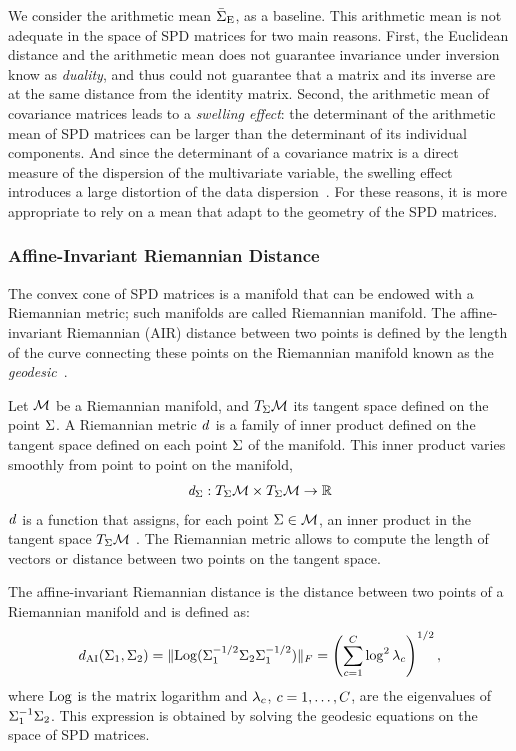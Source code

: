 We consider the arithmetic mean $\PmE$, as a baseline. 
This arithmetic mean is not adequate in the space of SPD matrices for two main reasons. 
First, the Euclidean distance and the arithmetic mean does not guarantee invariance under inversion know as \emph{duality}, and thus could not guarantee that a matrix and its inverse are at the same distance from the identity matrix. 
Second, the arithmetic mean of covariance matrices leads to a \emph{swelling effect}: the determinant of the arithmetic mean of SPD matrices can be larger than the determinant of its individual components.
And since the determinant of a covariance matrix is a direct measure of the dispersion of the multivariate variable, the swelling effect introduces a large distortion of the data dispersion~\cite{arsigny_geometric_2007}.
For these reasons, it is more appropriate to rely on a mean that adapt to the geometry of the SPD matrices. 

\subsubsection{Affine-Invariant Riemannian Distance}

The convex cone of SPD matrices is a manifold that can be endowed with a Riemannian metric; such manifolds are called Riemannian manifold.
The affine-invariant Riemannian (AIR) distance between two points is defined by the length of the curve connecting these points on the Riemannian manifold known as the \emph{geodesic}~\cite{pennec_riemannian_2006}. 

Let $\GenMa$ be a Riemannian manifold, and $T_\P\GenMa$ its tangent space defined on the point $\P$. 
A Riemannian metric $\metric$ is a family of inner product defined on the tangent space defined on each point $\P$ of the manifold.
This inner product varies smoothly from point to point on the manifold,
\[
 \metric_\P: T_\P\GenMa\times T_\P\GenMa \rightarrow \Re \]
$\metric$ is a function that assigns, for each point $\P \in \GenMa$, an inner product in the tangent space $T_\P\GenMa$  .
The Riemannian metric allows to compute the length of vectors or distance between two points on the tangent space. 

The affine-invariant Riemannian distance is the distance between two points of a Riemannian manifold and is defined as: 
\begin{equation}
\distAIRM(\P_1, \P_2) = \lVert \Logm(\P_1^{-1/2}\P_2\P_1^{-1/2}) \rVert_F = \left( \sum_{\chI=1}^{\dc} \log^2 \lambda_\chI \right)^{1/2},
\label{eq:dist_air}
\end{equation}
where $\Logm$ is the matrix logarithm and $\lambda_\chI$, $\chI = 1, \dots, \dc$, are the eigenvalues of $\P_1^{-1}\P_2$. %
This expression is obtained by solving the geodesic equations on the space of SPD matrices. 

